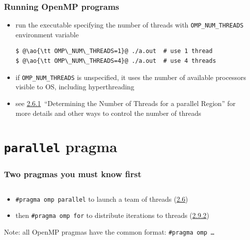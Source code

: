 \documentclass[12pt,dvipdfmx]{beamer}
\newcommand{\sectionompparallel}{{\href{https://www.openmp.org/spec-html/5.0/openmpse14.html\#x54-800002.6}{2.6}}}
\newcommand{\sectionompdeterminenumthreads}{{\href{https://www.openmp.org/spec-html/5.0/openmpsu35.html\#x55-880002.6.1}{2.6.1}}}
\newcommand{\sectionompfor}{{\href{https://www.openmp.org/spec-html/5.0/openmpsu41.html\#x64-1290002.9.2}{2.9.2}}}
\newcommand{\ao}[1]{{\color{blue}#1}}
\begin{document}
\begin{frame}[fragile]
\frametitle{Running OpenMP programs}
\begin{itemize}
\item run the executable specifying the number of threads
with {\tt OMP\_NUM\_THREADS} environment variable
\begin{lstlisting}
$ @\ao{\tt OMP\_NUM\_THREADS=1}@ ./a.out  # use 1 thread
$ @\ao{\tt OMP\_NUM\_THREADS=4}@ ./a.out  # use 4 threads
\end{lstlisting}

\item if {\tt OMP\_NUM\_THREADS} is unspecified,
  it uses the number of available
  processors visible to OS, including hyperthreading

\item see \sectionompdeterminenumthreads\
``Determining the Number of Threads for a parallel Region''
for more details and other ways to control the number of threads
\end{itemize}
\end{frame}

\section{{\tt parallel} pragma}

\begin{frame}
\frametitle{Two pragmas you must know first}
\begin{columns}
\begin{column}{0.5\textwidth}
\begin{itemize}

\item \ao{\tt \#pragma omp parallel} 
to launch a team of threads (\sectionompparallel)
\item then \ao{\tt \#pragma omp for} to distribute 
iterations to threads (\sectionompfor)
\end{itemize}
Note: all OpenMP pragmas have the common format: 
{\tt \#pragma omp \ldots}
\end{column}
\begin{column}{0.5\textwidth}
\def\svgwidth{0.8\textwidth}
{\scriptsize }
\end{column}
\end{columns}
\end{frame}
\end{document}
